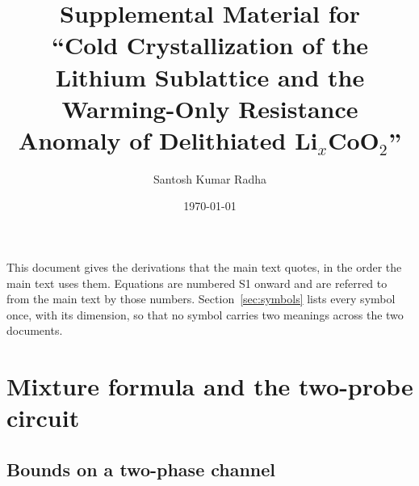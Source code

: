 \documentclass[reprint,twocolumn,prb,amsmath,amssymb,superscriptaddress,floatfix]{revtex4-2}
\begin{document}
\title{Supplemental Material for\\
``Cold Crystallization of the Lithium Sublattice and the Warming-Only
Resistance Anomaly of Delithiated Li$_x$CoO$_2$''}

\author{Santosh Kumar Radha}

\date{\today}

\maketitle

This document gives the derivations that the main text quotes, in the order the main text uses
them. Equations are numbered S1 onward and are referred to from the main text by those numbers.
Section~\ref{sec:symbols} lists every symbol once, with its dimension, so that no symbol carries
two meanings across the two documents.

\section{Mixture formula and the two-probe circuit}
\label{sec:mixture}

\subsection{Bounds on a two-phase channel}
\end{document}
